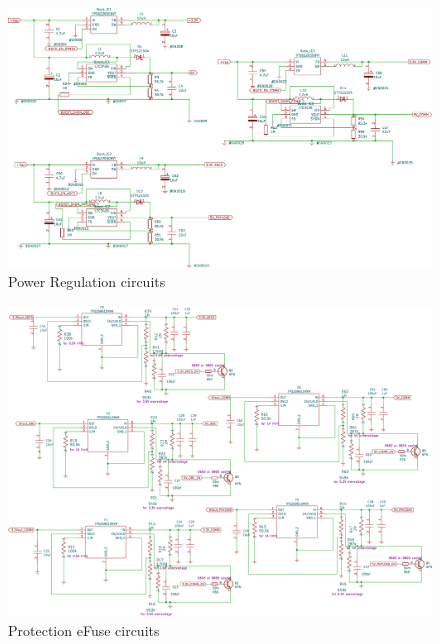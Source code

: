   \begin{figure}[H]
 	\centering
 	\includegraphics[width=0.99\columnwidth]{FrontMatter/pcb-Regulation Module.pdf}
 	\caption{\centering Power Regulation circuits}
 	\label{fig:reg 4lr}
 \end{figure}



 
   \begin{figure}[H]
 	\centering
 	\includegraphics[width=0.99\columnwidth]{FrontMatter/pcb-ProtectionCircuit.pdf}
 	\caption{\centering Protection eFuse circuits}
 	\label{fig:protecc 4lr}
 \end{figure}


